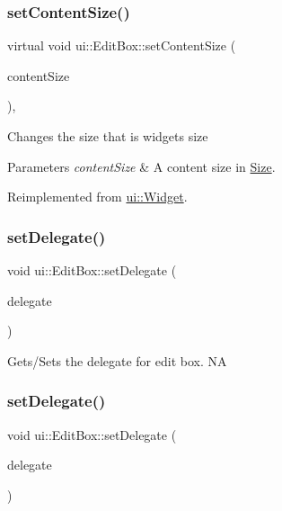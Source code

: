 \subsubsection{\texorpdfstring{set\+Content\+Size()}{setContentSize()}\hspace{0.1cm}{\footnotesize\ttfamily [2/2]}}
{\footnotesize\ttfamily virtual void ui\+::\+Edit\+Box\+::set\+Content\+Size (\begin{DoxyParamCaption}\item[{const \hyperlink{classSize}{Size} \&}]{content\+Size }\end{DoxyParamCaption})\hspace{0.3cm}{\ttfamily [override]}, {\ttfamily [virtual]}}

Changes the size that is widget\textquotesingle{}s size 
\begin{DoxyParams}{Parameters}
{\em content\+Size} & A content size in {\ttfamily \hyperlink{classSize}{Size}}. \\
\hline
\end{DoxyParams}


Reimplemented from \hyperlink{classui_1_1Widget_af5f35184ff3de275929e937f81a4ae30}{ui\+::\+Widget}.

\mbox{\label{classui_1_1EditBox_a6a6cd93d4204d3415483c4d531646409}} 
\subsubsection{\texorpdfstring{set\+Delegate()}{setDelegate()}\hspace{0.1cm}{\footnotesize\ttfamily [1/2]}}
{\footnotesize\ttfamily void ui\+::\+Edit\+Box\+::set\+Delegate (\begin{DoxyParamCaption}\item[{\hyperlink{classui_1_1EditBoxDelegate}{Edit\+Box\+Delegate} $\ast$}]{delegate }\end{DoxyParamCaption})}

Gets/\+Sets the delegate for edit box.  NA \mbox{\label{classui_1_1EditBox_a6a6cd93d4204d3415483c4d531646409}} 
\subsubsection{\texorpdfstring{set\+Delegate()}{setDelegate()}\hspace{0.1cm}{\footnotesize\ttfamily [2/2]}}
{\footnotesize\ttfamily void ui\+::\+Edit\+Box\+::set\+Delegate (\begin{DoxyParamCaption}\item[{\hyperlink{classui_1_1EditBoxDelegate}{Edit\+Box\+Delegate} $\ast$}]{delegate }\end{DoxyParamCaption})}

